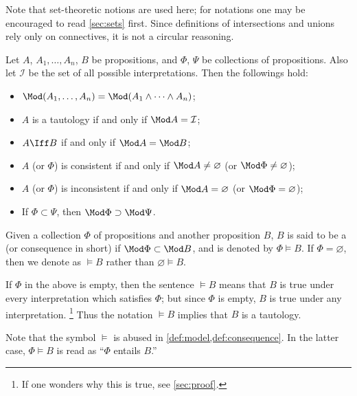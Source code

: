 Note that set-theoretic notions are used here;
for notations one may be encouraged to read \cref{sec:sets} first.
Since definitions of intersections and unions rely only on connectives,
it is not a circular reasoning.

\begin{remark}
    \label{rem:modelset}
    Let \(A\), \(A_1,\dots,A_n\), \(B\) be propositions,
    and \(\Phi\), \(\Psi\) be collections of propositions.
    Also let \(\mathcal I\) be the set of all possible interpretations.
    Then the followings hold:
    \begin{itemize}
        \item \(\Mod(A_1,\dots,A_n)=\Mod(A_1\wedge\dots\wedge A_n)\);
        \item \(A\) is a tautology if and only if \(\Mod A=\mathcal I\);
        \item \(A\Iff B\) if and only if \(\Mod A=\Mod B\);
        \item \(A\) (or \(\Phi\)) is consistent
        if and only if \(\Mod A\neq\varnothing\)
        (or \(\Mod\Phi\neq\varnothing\));
        \item \(A\) (or \(\Phi\)) is inconsistent
        if and only if \(\Mod A=\varnothing\)
        (or \(\Mod\Phi=\varnothing\));
        \item If \(\Phi\subset\Psi\), then \(\Mod\Phi\supset\Mod\Psi\).
    \end{itemize}
\end{remark}

\begin{definition}[Consequences]
    \label{def:consequence}
    Given a collection \(\Phi\) of propositions
    and another proposition \(B\),
    \(B\) is said to be
    a  (or consequence in short)
    if \(\Mod\Phi\subset\Mod B\),
    and is denoted by \(\Phi\models B\).
    If \(\Phi=\varnothing\),
    then we denote as \(\models B\)
    rather than \(\varnothing\models B\).
\end{definition}

If \(\Phi\) in the above is empty,
then the sentence \(\models B\) means that
\(B\) is true under every interpretation which satisfies \(\Phi\);
but since \(\Phi\) is empty,
\(B\) is true under any interpretation.%
\footnote{If one wonders why this is true,
see \cref{sec:proof}.}
Thus the notation \(\models B\) implies that \(B\) is a tautology.

Note that the symbol \(\models\) is abused
in \cref{def:model,def:consequence}.
In the latter case,
\(\Phi\models B\) is read as ``\(\Phi\) entails \(B\).''


